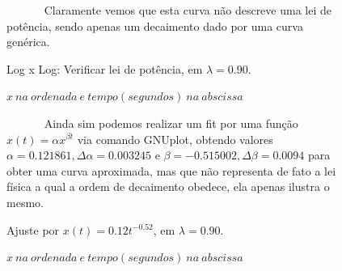 \documentclass[pdftex,12pt,a4paper]{article}
\begin{document}
\begin{figure}
~~~~~~ Claramente vemos que esta curva não descreve uma lei de potência, sendo apenas um decaimento dado por uma curva genérica.

\centering
\caption{Log x Log: Verificar lei de potência, em $\lambda = 0.90$.}
\caption*{$x\ na\ ordenada\ e\ tempo(segundos)\ na\ abscissa$}
\end{figure}

\begin{figure}
~~~~~~ Ainda sim podemos realizar um fit por uma função $x(t) = \alpha x^{\beta t}$ via comando GNUplot, obtendo valores $\alpha = 0.121861, \Delta \alpha = 0.003245$ e $\beta = -0.515002, \Delta \beta = 0.0094$ para obter uma curva aproximada, mas que não representa de fato a lei física a qual a ordem de decaimento obedece, ela apenas ilustra o mesmo.

\centering
\caption{Ajuste por $x(t) = 0.12t^{-0.52}$, em $\lambda = 0.90$.}
\caption*{$x\ na\ ordenada\ e\ tempo(segundos)\ na\ abscissa$}
\end{figure}
\end{document}
